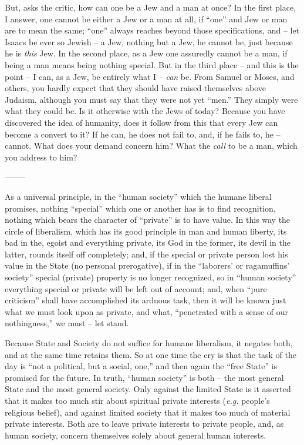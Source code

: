 \documentclass[12pt,a4paper]{book}
\begin{document}
But, asks the critic, how can one be a Jew and a man at once? In the first 
place, I answer, one cannot be either a Jew or a man at all, if ``one'' and 
Jew or man are to mean the same; ``one'' always reaches beyond those 
specifications, and -- let Isaacs be ever so Jewish -- a Jew, nothing but a 
Jew, he cannot be, just because he is \textit{this} Jew. In the second place, 
as a Jew one assuredly cannot be a man, if being a man means being nothing 
special. But in the third place -- and this is the point -- I can, as a Jew, 
be entirely what I -- \textit{can} be. From Samuel or Moses, and others, you 
hardly expect that they should have raised themselves above Judaism, although 
you must say that they were not yet ``men.'' They simply were what they 
could be. Is it otherwise with the Jews of today? Because you have discovered 
the idea of humanity, does it follow from this that every Jew can become a 
convert to it? If he can, he does not fail to, and, if he fails to, he -- 
cannot. What does your demand concern him? What the \textit{call} to be a man, 
which you address to him?

\begin{center}
--------\end{center}


As a universal principle, in the ``human society'' which the humane liberal 
promises, nothing ``special'' which one or another has is to find 
recognition, nothing which bears the character of ``private'' is to have 
value. In this way the circle of liberalism, which has its good principle in 
man and human liberty, its bad in the, egoist and everything private, its God 
in the former, its devil in the latter, rounds itself off completely; and, if 
the special or private person lost his value in the State (no personal 
prerogative), if in the ``laborers' or ragamuffins' society'' special 
(private) property is no longer recognized, so in ``human society'' 
everything special or private will be left out of account; and, when ``pure 
criticism'' shall have accomplished its arduous task, then it will be known 
just what we must look upon as private, and what, ``penetrated with a sense 
of our nothingness,'' we must -- let stand.

Because State and Society do not suffice for humane liberalism, it negates 
both, and at the same time retains them. So at one time the cry is that the 
task of the day is ``not a political, but a social, one,'' and then again 
the ``free State'' is promised for the future. In truth, ``human society'' 
is both -- the most general State and the most general society. Only against 
the limited State is it asserted that it makes too much stir about spiritual 
private interests (\textit{e.g.} people's religious belief), and against 
limited society that it makes too much of material private interests. Both are 
to leave private interests to private people, and, as human society, concern 
themselves solely about general human interests.
\end{document}
